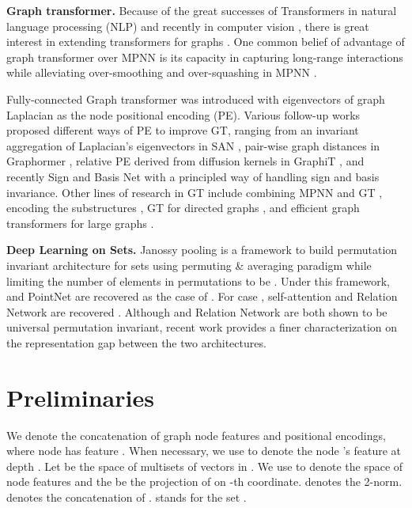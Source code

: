 \documentclass[nohyperref]{article}
\theoremstyle{plain}
\theoremstyle{definition}
\theoremstyle{remark}
\newcommand{\DS}{\text{DeepSets}}
\begin{document}
\textbf{Graph transformer.}
Because of the great successes of Transformers in natural language processing (NLP) \citep{vaswani2017attention,wolf2020transformers} and recently in computer vision \citep{dosovitskiy2020image,d2021convit,liu2021swin}, there is great interest in extending transformers for graphs \citep{muller2023attending}. One common belief of advantage of graph transformer over MPNN is its capacity in capturing long-range interactions while alleviating over-smoothing \citep{li2018deeper,oono2019graph,cai2020note} and over-squashing in MPNN \citep{alon2020bottleneck,topping2021understanding}. 

Fully-connected Graph transformer \citep{dwivedi2020generalization} was introduced with eigenvectors of graph Laplacian as the node positional encoding (PE). Various follow-up works proposed different ways of PE to improve GT, ranging from an invariant aggregation of Laplacian's eigenvectors in SAN \citep{kreuzer2021rethinking}, pair-wise graph distances in Graphormer \citep{ying2021transformers}, relative PE derived from diffusion kernels in GraphiT \citep{mialon2021graphit}, and recently Sign and Basis Net \citep{lim2022sign} with a principled way of handling sign and basis invariance. 
Other lines of research in GT include combining MPNN and GT  \citep{wu2021representing,rampavsek2022recipe}, encoding the substructures \citep{chen2022structure}, GT for directed graphs \citep{geisler2023transformers}, and efficient graph transformers for large graphs \citep{wunodeformer}.

\textbf{Deep Learning on Sets.} Janossy pooling \citep{murphy2018janossy} is a framework to build permutation invariant architecture for sets using permuting \& averaging paradigm while limiting the number of elements in permutations to be .  Under this framework, \DS{} \citep{zaheer2017deep} and PointNet \citep{qi2017pointnet} are recovered as the case of . For case , self-attention and Relation Network \citep{santoro2017simple} are recovered \citep{wagstaff2022universal}. Although \DS{} and Relation Network \citep{santoro2017simple} are both shown to be universal permutation invariant, recent work \citep{zweig2022exponential} provides a finer characterization on the representation gap between the two architectures.  



\section{Preliminaries}
We denote  the concatenation of graph node features and positional encodings, where node  has feature . When necessary, we use  to denote the node 's feature at depth .  Let  be the space of multisets of vectors in . We use  to denote the space of node features and the  be the projection of  on -th coordinate.  denotes the 2-norm.  denotes the concatenation of .  stands for the set .
\end{document}
